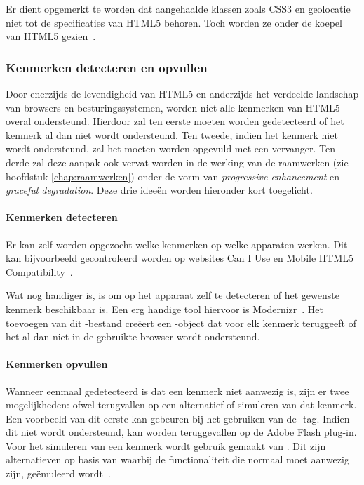 Er dient opgemerkt te worden dat aangehaalde klassen zoals CSS3 en geolocatie niet tot de specificaties van HTML5 behoren. 
Toch worden ze onder de koepel van HTML5 gezien~\cite{MacDonald2011}.

\subsubsection{Kenmerken detecteren en opvullen}
Door enerzijds de levendigheid van HTML5 en anderzijds het verdeelde landschap van browsers en besturingssystemen, worden niet alle kenmerken van HTML5 overal ondersteund. 
Hierdoor zal ten eerste moeten worden gedetecteerd of het kenmerk al dan niet wordt ondersteund.
Ten tweede, indien het kenmerk niet wordt ondersteund, zal het moeten worden opgevuld met een vervanger.
Ten derde zal deze aanpak ook vervat worden in de werking van de raamwerken (zie hoofdstuk \ref{chap:raamwerken}) onder de vorm van \emph{progressive enhancement} en \emph{graceful degradation}.
Deze drie ideeën worden hieronder kort toegelicht.

\paragraph{Kenmerken detecteren}
Er kan zelf worden opgezocht welke kenmerken op welke apparaten werken. 
Dit kan bijvoorbeeld gecontroleerd worden op websites Can I Use en Mobile HTML5 Compatibility~\cite{Deveria2013c,Firtman2013an,MacDonald2011}. 

Wat nog handiger is, is om op het apparaat zelf te detecteren of het gewenste kenmerk beschikbaar is. 
Een erg handige tool hiervoor is Modernizr~\cite{Modernizr2012}. 
Het toevoegen van dit \js{}-bestand creëert een \js{}-object dat voor elk kenmerk teruggeeft of het al dan niet in de gebruikte browser wordt ondersteund.

\paragraph{Kenmerken opvullen}
Wanneer eenmaal gedetecteerd is dat een kenmerk niet aanwezig is, zijn er twee mogelijkheden: ofwel terugvallen op een alternatief of simuleren van dat kenmerk. 
Een voorbeeld van dit eerste kan gebeuren bij het gebruiken van de -tag. 
Indien dit niet wordt ondersteund, kan worden teruggevallen op de Adobe Flash plug-in. 
Voor het simuleren van een kenmerk wordt gebruik gemaakt van . 
Dit zijn alternatieven op basis van \js{} waarbij de  functionaliteit die normaal moet aanwezig zijn, geëmuleerd wordt~\cite{MacDonald2011,Weyl2011}.

